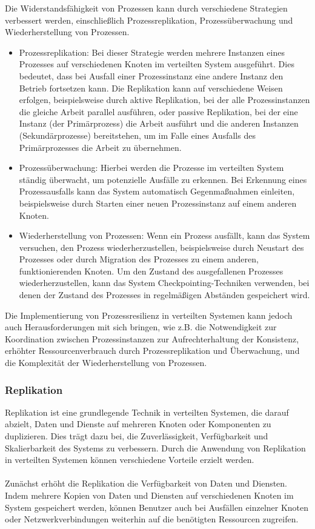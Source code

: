 \documentclass[../vs-script-first-v01.tex]{subfiles}
\begin{document}
Die Widerstandsfähigkeit von Prozessen kann durch verschiedene Strategien verbessert werden, einschließlich Prozessreplikation, Prozessüberwachung und Wiederherstellung von Prozessen.
\begin{itemize}
\item Prozessreplikation: Bei dieser Strategie werden mehrere Instanzen eines Prozesses auf verschiedenen Knoten im verteilten System ausgeführt. Dies bedeutet, dass bei Ausfall einer Prozessinstanz eine andere Instanz den Betrieb fortsetzen kann. Die Replikation kann auf verschiedene Weisen erfolgen, beispielsweise durch aktive Replikation, bei der alle Prozessinstanzen die gleiche Arbeit parallel ausführen, oder passive Replikation, bei der eine Instanz (der Primärprozess) die Arbeit ausführt und die anderen Instanzen (Sekundärprozesse) bereitstehen, um im Falle eines Ausfalls des Primärprozesses die Arbeit zu übernehmen.
\item Prozessüberwachung: Hierbei werden die Prozesse im verteilten System ständig überwacht, um potenzielle Ausfälle zu erkennen. Bei Erkennung eines Prozessausfalls kann das System automatisch Gegenmaßnahmen einleiten, beispielsweise durch Starten einer neuen Prozessinstanz auf einem anderen Knoten.
\item Wiederherstellung von Prozessen: Wenn ein Prozess ausfällt, kann das System versuchen, den Prozess wiederherzustellen, beispielsweise durch Neustart des Prozesses oder durch Migration des Prozesses zu einem anderen, funktionierenden Knoten. Um den Zustand des ausgefallenen Prozesses wiederherzustellen, kann das System Checkpointing-Techniken verwenden, bei denen der Zustand des Prozesses in regelmäßigen Abständen gespeichert wird.
\end{itemize}
Die Implementierung von Prozessresilienz in verteilten Systemen kann jedoch auch Herausforderungen mit sich bringen, wie z.B. die Notwendigkeit zur Koordination zwischen Prozessinstanzen zur Aufrechterhaltung der Konsistenz, erhöhter Ressourcenverbrauch durch Prozessreplikation und Überwachung, und die Komplexität der Wiederherstellung von Prozessen. 

\subsubsection{Replikation}

Replikation ist eine grundlegende Technik in verteilten Systemen, die darauf abzielt, Daten und Dienste auf mehreren Knoten oder Komponenten zu duplizieren. Dies trägt dazu bei, die Zuverlässigkeit, Verfügbarkeit und Skalierbarkeit des Systems zu verbessern. Durch die Anwendung von Replikation in verteilten Systemen können verschiedene Vorteile erzielt werden.
\\\\
Zunächst erhöht die Replikation die Verfügbarkeit von Daten und Diensten. Indem mehrere Kopien von Daten und Diensten auf verschiedenen Knoten im System gespeichert werden, können Benutzer auch bei Ausfällen einzelner Knoten oder Netzwerkverbindungen weiterhin auf die benötigten Ressourcen zugreifen.
\end{document}
